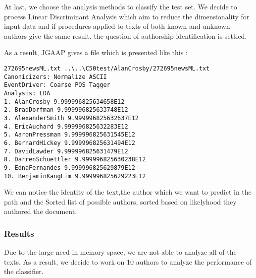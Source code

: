 At last, we choose the analysis methods to classify the test set.
We decide to process Linear Discriminant Analysis which aim to reduce the dimensionality for input data and if procedures applied to texts of both known and unknown authors give the same
result, the question of authorship identification is settled.

As a result, JGAAP gives a file which is presented like this :
\begin{verbatim}
272695newsML.txt ..\..\C50test/AlanCrosby/272695newsML.txt
Canonicizers: Normalize ASCII 
EventDriver: Coarse POS Tagger 
Analysis: LDA 
1. AlanCrosby 9.999996825634658E12
2. BradDorfman 9.999996825633748E12
3. AlexanderSmith 9.999996825632637E12
4. EricAuchard 9.999996825632283E12
5. AaronPressman 9.999996825631545E12
6. BernardHickey 9.999996825631494E12
7. DavidLawder 9.999996825631479E12
8. DarrenSchuettler 9.999996825630238E12
9. EdnaFernandes 9.999996825629879E12
10. BenjaminKangLim 9.999996825629223E12
\end{verbatim}

We can notice the identity of the text,the author which we want to predict in the path and the Sorted list of possible authors, sorted based on likelyhood they authored the document.

\subsubsection{Results}
Due to the large need in memory space, we are not able to analyze all of the texts. As a result, we decide to work on 10 authors to analyze the performance of the classifier.
